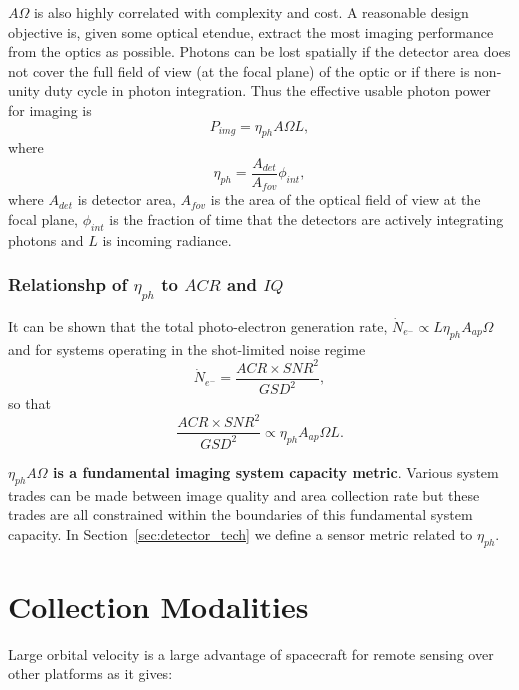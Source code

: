 \documentclass[]{spieman}  %
\begin{document}
$A\Omega$ is also highly correlated with complexity and cost.  A reasonable design objective is, given some optical etendue, extract the most imaging performance from the optics as possible.
Photons can be lost spatially if the detector area does not cover the full field of view (at the focal plane) of the optic or if there is non-unity duty cycle in photon integration.  Thus the effective usable photon power for imaging is
\begin{equation}
    P_{img} = \eta_{ph} A \Omega L ,
\end{equation}
where
\begin{equation}
    \eta_{ph} = \frac{A_{det}}{A_{fov}} \phi_{int},
\end{equation}
where $A_{det}$ is detector area, $A_{fov}$ is the area of the optical field of view at the focal plane, $\phi_{int}$ is the fraction of time that the detectors are actively integrating photons and $L$ is incoming radiance.

\subsubsection{Relationshp of $\eta_{ph}$ to $ACR$ and $IQ$}

It can be shown that the total photo-electron generation rate, $\dot{N}_{e^-} \propto L\eta_{ph}A_{ap}\Omega$ and for systems operating in the shot-limited noise regime
\begin{equation}
    \dot{N}_{e^-} = \frac{ACR \times SNR^2}{GSD^2},
\end{equation}
so that
\begin{equation}
\label{eq:acr_snr_gsd}
    \frac{ACR \times SNR^2}{GSD^2} \propto \eta_{ph} A_{ap}\Omega L.
\end{equation}

\textbf{$\eta_{ph} A \Omega$ is a fundamental imaging system capacity metric}.  Various system trades can be made between image quality and area collection rate but these trades are all constrained within the boundaries of this fundamental system capacity.  In Section~\ref{sec:detector_tech} we define a sensor metric related to $\eta_{ph}$.

\section{Collection Modalities}
\label{sec:modalities}
Large orbital velocity is a large advantage of spacecraft for remote sensing over other platforms as it gives:
\end{document}
